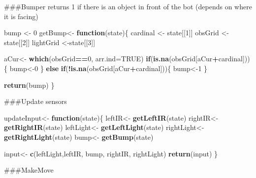 \documentclass[]{article}
\newenvironment{Shaded}{\begin{snugshade}}{\end{snugshade}}
\newcommand{\ControlFlowTok}[1]{\textcolor[rgb]{0.13,0.29,0.53}{\textbf{#1}}}
\newcommand{\DataTypeTok}[1]{\textcolor[rgb]{0.13,0.29,0.53}{#1}}
\newcommand{\DecValTok}[1]{\textcolor[rgb]{0.00,0.00,0.81}{#1}}
\newcommand{\KeywordTok}[1]{\textcolor[rgb]{0.13,0.29,0.53}{\textbf{#1}}}
\newcommand{\NormalTok}[1]{#1}
\newcommand{\OperatorTok}[1]{\textcolor[rgb]{0.81,0.36,0.00}{\textbf{#1}}}
\newcommand{\OtherTok}[1]{\textcolor[rgb]{0.56,0.35,0.01}{#1}}
\newcommand{\StringTok}[1]{\textcolor[rgb]{0.31,0.60,0.02}{#1}}
\begin{document}
\#\#\#Bumper returns 1 if there is an object in front of the bot
(depends on where it is facing)

\begin{Shaded}
\begin{Highlighting}[]
\NormalTok{bump <-}\StringTok{ }\DecValTok{0}
\NormalTok{getBump<-}\StringTok{ }\ControlFlowTok{function}\NormalTok{(state)\{}
\NormalTok{      cardinal <-}\StringTok{ }\NormalTok{state[[}\DecValTok{1}\NormalTok{]]}
\NormalTok{  obsGrid <-}\StringTok{ }\NormalTok{state[[}\DecValTok{2}\NormalTok{]]}
\NormalTok{  lightGrid <-state[[}\DecValTok{3}\NormalTok{]]}
  
\NormalTok{  aCur<-}\StringTok{ }\KeywordTok{which}\NormalTok{(obsGrid}\OperatorTok{==}\DecValTok{0}\NormalTok{, }\DataTypeTok{arr.ind=}\OtherTok{TRUE}\NormalTok{)}
  \ControlFlowTok{if}\NormalTok{(}\KeywordTok{is.na}\NormalTok{(obsGrid[aCur}\OperatorTok{+}\NormalTok{cardinal]))\{}
\NormalTok{    bump<-}\DecValTok{0}
\NormalTok{  \}}
  \ControlFlowTok{else} \ControlFlowTok{if}\NormalTok{(}\OperatorTok{!}\KeywordTok{is.na}\NormalTok{(obsGrid[aCur}\OperatorTok{+}\NormalTok{cardinal]))\{}
\NormalTok{    bump<-}\DecValTok{1}
\NormalTok{  \}}
  

  \KeywordTok{return}\NormalTok{(bump)}
\NormalTok{\}}
\end{Highlighting}
\end{Shaded}

\#\#\#Update sensors

\begin{Shaded}
\begin{Highlighting}[]
\NormalTok{updateInput<-}\StringTok{ }\ControlFlowTok{function}\NormalTok{(state)\{}
\NormalTok{    leftIR<-}\StringTok{ }\KeywordTok{getLeftIR}\NormalTok{(state)}
\NormalTok{    rightIR<-}\StringTok{ }\KeywordTok{getRightIR}\NormalTok{(state)}
\NormalTok{    leftLight<-}\StringTok{ }\KeywordTok{getLeftLight}\NormalTok{(state)}
\NormalTok{    rightLight<-}\StringTok{ }\KeywordTok{getRightLight}\NormalTok{(state)}
\NormalTok{    bump<-}\StringTok{ }\KeywordTok{getBump}\NormalTok{(state)}
    
\NormalTok{    input<-}\StringTok{ }\KeywordTok{c}\NormalTok{(leftLight,leftIR, bump, rightIR, rightLight) }
    \KeywordTok{return}\NormalTok{(input)}
\NormalTok{\}}
\end{Highlighting}
\end{Shaded}

\#\#\#MakeMove
\end{document}
